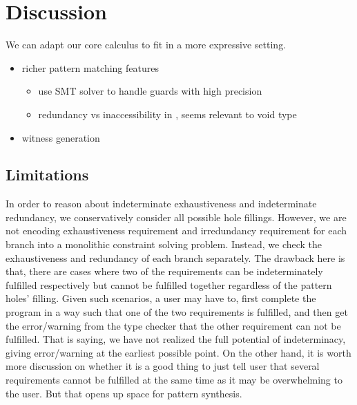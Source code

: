 \section{Discussion}
We can adapt our core calculus to fit in a more expressive setting.

\begin{itemize}
\item richer pattern matching features
\begin{itemize}
    \item \cite{DBLP:journals/corr/abs-1909-04160} use SMT solver to handle guards with high precision
    \item redundancy vs inaccessibility in \cite{DBLP:journals/pacmpl/GrafJS20}, seems relevant to void type
\end{itemize}
\item witness generation
\end{itemize}

\subsection{Limitations}
In order to reason about indeterminate exhaustiveness and indeterminate redundancy, we conservatively consider all possible hole fillings. 
However, we are not encoding exhaustiveness requirement and irredundancy requirement for each branch into a monolithic constraint solving problem. 
Instead, we check the exhaustiveness and redundancy of each branch separately. 
The drawback here is that, there are cases where two of the requirements can be indeterminately fulfilled respectively but cannot be fulfilled together regardless of the pattern holes' filling. Given such scenarios, a user may have to, first complete the program in a way such that one of the two requirements is fulfilled, and then get the error/warning from the type checker that the other requirement can not be fulfilled. That is saying, we have not realized the full potential of indeterminacy, giving error/warning at the earliest possible point. On the other hand, it is worth more discussion on whether it is a good thing to just tell user that several requirements cannot be fulfilled at the same time as it may be overwhelming to the user. But that opens up space for pattern synthesis.